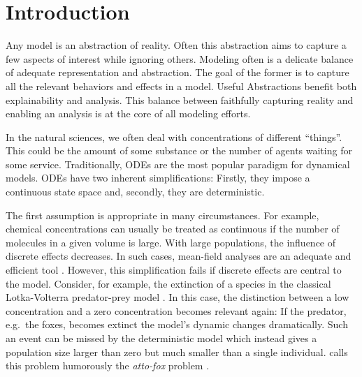 \chapter{Introduction}

Any model is an abstraction of reality.
Often this abstraction aims to capture a few aspects of interest
while ignoring others.
Modeling often is a delicate balance of adequate representation and abstraction.
The goal of the former is to capture all the relevant behaviors and
effects in a model.
Useful Abstractions benefit both explainability and analysis.
This balance between faithfully capturing reality and enabling an
analysis is at the core of all modeling efforts.

In the natural sciences, we often deal with concentrations of
different ``things''.
This could be the amount of some substance or the number of agents
waiting for some service.
Traditionally, \aclp{ODE} are the most popular paradigm for dynamical models.
\Aclp{ODE} have two inherent simplifications: Firstly, they impose a
continuous state space and, secondly, they are deterministic.

The first assumption is appropriate in many circumstances.
For example, chemical concentrations can usually be treated as
continuous if the number of molecules in a given volume is
large.
With large populations, the influence of discrete effects decreases.
In such cases, mean-field analyses are an adequate and efficient tool
\parencite{bortolussi2013continuous}.
However, this simplification fails if discrete effects are central to the model.
Consider, for example, the extinction of a species in the classical
Lotka-Volterra predator-prey model \parencite{lotka1925elements}.
In this case, the distinction between a low concentration and a zero
concentration becomes relevant again:
If the predator, e.g.\ the foxes, becomes extinct the model's dynamic
changes dramatically.
Such an event can be missed by the deterministic model which instead
gives a population size larger than zero but much smaller than a
single individual.
 calls this problem humorously the
\emph{atto-fox} problem \parencite{mollison1991dependence}.

